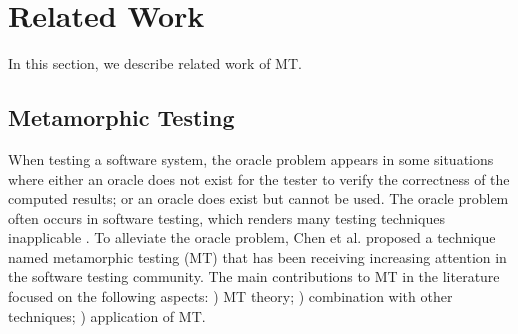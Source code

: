 \documentclass[conference]{IEEEtran}
\newcommand{\rmnum}[1]{\expandafter{\romannumeral #1\relax}}
\begin{document}
\section{Related Work}
\label{section:related}
In this section, we describe related work of MT.

\subsection{Metamorphic Testing}
When testing a software system, the oracle problem appears in some situations where either an oracle does not exist for the tester to verify the correctness of the computed results; or an oracle does exist but cannot be used. The oracle problem often occurs in software testing, which renders many testing techniques inapplicable \cite{barr2015oracle}. To alleviate the oracle problem, Chen et al. \cite{chen1998metamorphic} proposed a technique named metamorphic testing (MT) that has been receiving increasing attention in the software testing community\cite{barr2015oracle, segura2016survey, chen2018metamorphic}. The main contributions to MT in the literature focused on the following aspects: \rmnum{1}) MT theory; \rmnum{2}) combination with other techniques; \rmnum{3}) application of MT.
\end{document}
